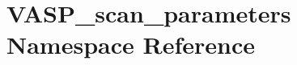 \hypertarget{namespace_v_a_s_p__scan__parameters}{\section{V\+A\+S\+P\+\_\+scan\+\_\+parameters Namespace Reference}
\label{namespace_v_a_s_p__scan__parameters}
}
